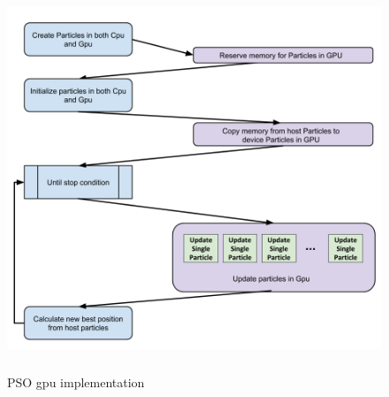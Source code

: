 \documentclass[journal,onecolumn]{IEEEtran}
\begin{document}
\begin{figure}[H]
\centering
\captionsetup{justification=centering}
\includegraphics[width=4.5in,height=4.5in]{_img/img_PSO_algorithm_gpu.png}
\caption{PSO gpu implementation}
\end{figure}
\end{document}

